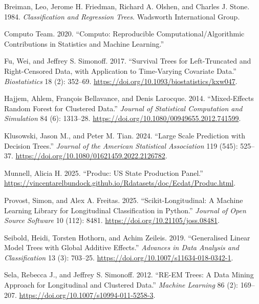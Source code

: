 \documentclass[
]{article}
\newlength{\cslhangindent}
\newenvironment{CSLReferences}[2] %
 {\begin{list}{}{%
  \setlength{\itemindent}{0pt}
  \setlength{\leftmargin}{0pt}
  \setlength{\parsep}{0pt}
  \ifodd #1
   \setlength{\leftmargin}{\cslhangindent}
   \setlength{\itemindent}{-1\cslhangindent}
  \fi
  \setlength{\itemsep}{#2\baselineskip}}}
 {\end{list}}
\begin{document}
\label{refs}
\begin{CSLReferences}{1}{0}
Breiman, Leo, Jerome H. Friedman, Richard A. Olshen, and Charles J.
Stone. 1984. \emph{Classification and Regression Trees}. Wadsworth
International Group.

Computo Team. 2020. {``Computo: Reproducible Computational/Algorithmic
Contributions in Statistics and Machine Learning.''}

Fu, Wei, and Jeffrey S. Simonoff. 2017. {``Survival Trees for
Left-Truncated and Right-Censored Data, with Application to Time-Varying
Covariate Data.''} \emph{Biostatistics} 18 (2): 352--69.
\url{https://doi.org/10.1093/biostatistics/kxw047}.

Hajjem, Ahlem, François Bellavance, and Denis Larocque. 2014.
{``Mixed-Effects Random Forest for Clustered Data.''} \emph{Journal of
Statistical Computation and Simulation} 84 (6): 1313--28.
\url{https://doi.org/10.1080/00949655.2012.741599}.

Klusowski, Jason M., and Peter M. Tian. 2024. {``Large Scale Prediction
with Decision Trees.''} \emph{Journal of the American Statistical
Association} 119 (545): 525--37.
\url{https://doi.org/10.1080/01621459.2022.2126782}.

Munnell, Alicia H. 2025. {``Produc: US State Production Panel.''}
\url{https://vincentarelbundock.github.io/Rdatasets/doc/Ecdat/Produc.html}.

Provost, Simon, and Alex A. Freitas. 2025. {``Scikit-Longitudinal: A
Machine Learning Library for Longitudinal Classification in Python.''}
\emph{Journal of Open Source Software} 10 (112): 8481.
\url{https://doi.org/10.21105/joss.08481}.

Seibold, Heidi, Torsten Hothorn, and Achim Zeileis. 2019. {``Generalised
Linear Model Trees with Global Additive Effects.''} \emph{Advances in
Data Analysis and Classification} 13 (3): 703--25.
\url{https://doi.org/10.1007/s11634-018-0342-1}.

Sela, Rebecca J., and Jeffrey S. Simonoff. 2012. {``{RE-EM} Trees: A
Data Mining Approach for Longitudinal and Clustered Data.''}
\emph{Machine Learning} 86 (2): 169--207.
\url{https://doi.org/10.1007/s10994-011-5258-3}.


\end{CSLReferences}
\end{document}
